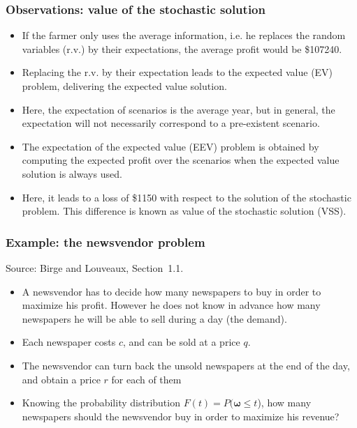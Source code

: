 \documentclass{beamer}
\def\bomega{\boldsymbol\omega}
\def\red{\color{red}}
\begin{document}
\begin{frame}
\frametitle{Observations: value of the stochastic solution}

\begin{itemize}
\item 
If the farmer only uses the average information, i.e. he replaces the random variables (r.v.) by their expectations, the average profit would be \$107240.
\item
Replacing the r.v. by their expectation 
leads to the expected value (EV) problem, delivering the expected value solution. \item
Here, the expectation of scenarios is the average year, but in general, the expectation will not necessarily correspond to a pre-existent scenario.
\item
The expectation of the expected value (EEV) problem is obtained by computing the expected profit over the scenarios when the expected value solution is always used.
\item
Here, it leads to a loss of \$1150 with respect to the solution of the stochastic problem. This difference is known as {\red value of the stochastic solution (VSS)}.
\end{itemize}

\end{frame}


\begin{frame}
\frametitle{Example: the newsvendor problem}

Source: Birge and Louveaux, Section~1.1.

\mbox{}

\begin{itemize}
	\item
	A newsvendor has to decide how many newspapers to buy in order to maximize his profit.
	However he does not know in advance how many newspapers he will be able to sell during a day (the demand).
	\item
	Each newspaper costs $c$, and can be sold at a price $q$.
	\item
	The newsvendor can turn back the unsold newspapers at the end of the day, and obtain a price $r$ for each of them
	\item
	Knowing the probability distribution $F(t) = P(\bomega \leq t$), how many newspapers should the newsvendor buy in order to maximize his revenue?
\end{itemize}

\end{frame}
\end{document}
